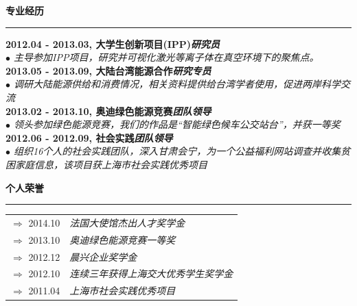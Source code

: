 \documentclass[a4paper,12pt,final]{memoir}
\newcommand{\myThemeColor}{RoyalBlue}
\newcommand{\SmallSep}{\vspace{0.9em}}
\newcommand{\CVSection}[1]
	{\Large\textbf{#1}\par
	\vspace{0.2cm}\normalsize\normalfont}
\newcommand{\CVItem}[1]
	{\textbf{\color{\myThemeColor} #1}}
\begin{document}
\begin{CJK*}{UTF8}{gbsn}
\CVSection{专业经历}
\hrule
\SmallSep
\CVItem{2012.04 - 2013.03, 大学生创新项目(IPP)\hfill\emph{研究员}}\\
\textit{$\bullet$ 主导参加IPP项目，研究并可视化激光等离子体在真空环境下的聚焦点。} 
\\
\CVItem{2013.05 - 2013.09, 大陆台湾能源合作\hfill\emph{研究专员}}\\
\textit{$\bullet$ 调研大陆能源供给和消费情况，相关资料提供给台湾学者使用，促进两岸科学交流} 
\\
\CVItem{2013.02 - 2013.10, 奥迪绿色能源竞赛\hfill\emph{团队领导}}\\
\textit{$\bullet$ 领头参加绿色能源竞赛，我们的作品是“智能绿色候车公交站台”，并获一等奖}
\\
\CVItem{2012.06 - 2012.09, 社会实践\hfill\emph{团队领导}}\\
\textit{$\bullet$ 组织16个人的社会实践团队，深入甘肃会宁，为一个公益福利网站调查并收集贫困家庭信息，该项目获上海市社会实践优秀项目} 

\CVSection{个人荣誉}
\hrule
\SmallSep
	\begin{tabular}{l|l}
		$\Rightarrow$ 2014.10&\textit{法国大使馆杰出人才奖学金}\footnotesize\\
		$\Rightarrow$ 2013.10&\textit{奥迪绿色能源竞赛一等奖}\\
		$\Rightarrow$ 2012.12&\textit{晨兴企业奖学金}\\
		$\Rightarrow$ 2012.10&\textit{连续三年获得上海交大优秀学生奖学金}\\
		$\Rightarrow$ 2011.04&\textit{上海市社会实践优秀项目}\footnotesize\\
	\end{tabular}

\end{CJK*}
\end{document}
